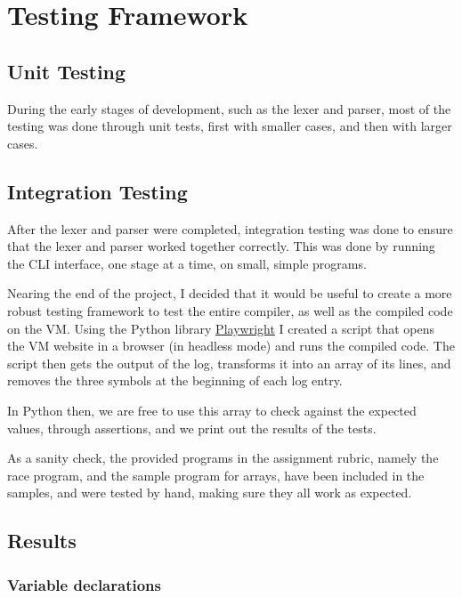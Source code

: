 \section{Testing Framework}

\subsection{Unit Testing}

During the early stages of development, such as the lexer and parser, most of
the testing was done through unit tests, first with smaller cases, and then with
larger cases.

\subsection{Integration Testing}

After the lexer and parser were completed, integration testing was done to
ensure that the lexer and parser worked together correctly. This was done by
running the CLI interface, one stage at a time, on small, simple programs.

Nearing the end of the project, I decided that it would be useful to create a
more robust testing framework to test the entire compiler, as well as the
compiled code on the VM. Using the Python library
\href{https://playwright.dev/python/}{Playwright} I created a script that opens
the VM website in a browser (in headless mode) and runs the compiled code. The
script then gets the output of the log, transforms it into an array of its
lines, and removes the three  symbols at the beginning of each log
entry.

In Python then, we are free to use this array to check against the expected
values, through assertions, and we print out the results of the tests.

As a sanity check, the provided programs in the assignment rubric, namely the
race program, and the sample program for arrays, have been included in the
samples, and were tested by hand, making sure they all work as expected.



\subsection{Results}

\subsubsection*{Variable declarations}

